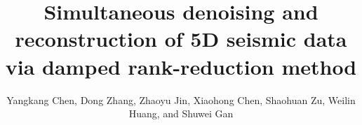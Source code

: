 \title{Simultaneous denoising and reconstruction of 5D seismic data via damped rank-reduction method}

\renewcommand{\thefootnote}{\fnsymbol{footnote}}
\author{Yangkang Chen\footnotemark[1], Dong Zhang\footnotemark[2], Zhaoyu Jin\footnotemark[3], Xiaohong Chen\footnotemark[2], Shaohuan Zu\footnotemark[2], Weilin Huang\footnotemark[2] , and Shuwei Gan\footnotemark[2]}
\address{
\footnotemark[1]Bureau of Economic Geology \\
John A. and Katherine G. Jackson School of Geosciences \\
The University of Texas at Austin \\
University Station, Box X \\
Austin, TX 78713-8924 \\
Email: ykchen@utexas.edu \\
\footnotemark[2] State Key Laboratory of Petroleum Resources and Prospecting \\
China University of Petroleum \\
Fuxue Road 18th\\
Beijing, China, 102200 \\
zhangdongconan@163.com\&chenxh@cup.edu.cn \& shaohuanzu@gmail.com \&  cup\_hwl@126.com\&gsw19900128@126.com  \\ 
\footnotemark[3]School of Geosciences \\
University of Edinburgh \\
Edinburgh,UK, EH9 3JW \\
s1263999@sms.ed.ac.uk
}


\maketitle

